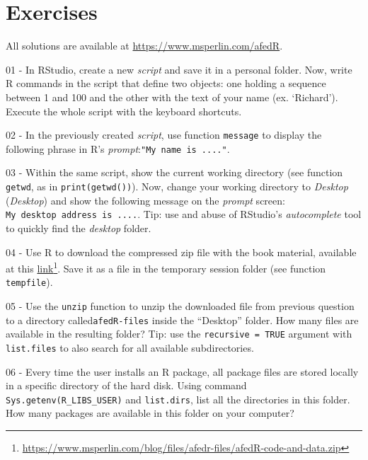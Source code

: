 \documentclass[
  12pt,
]{book}
\begin{document}
\hypertarget{exercises-basic-exercises}{%
\section{Exercises}\label{exercises-basic-exercises}}

All solutions are available at \url{https://www.msperlin.com/afedR}.

01 -
In RStudio, create a new \emph{script} and save it in a personal folder. Now, write R commands in the script that define two objects: one holding a sequence between 1 and 100 and the other with the text of your name (ex. `Richard'). Execute the whole script with the keyboard shortcuts.

02 -
In the previously created \emph{script}, use function \texttt{message} to display the following phrase in R's \emph{prompt}:\texttt{"My\ name\ is\ ...."}.

03 -
Within the same script, show the current working directory (see function \texttt{getwd}, as in \texttt{print(getwd())}). Now, change your working directory to \emph{Desktop} (\emph{Desktop}) and show the following message on the \emph{prompt} screen: \texttt{\textquotesingle{}My\ desktop\ address\ is\ ....\textquotesingle{}}. Tip: use and abuse of RStudio's \emph{autocomplete} tool to quickly find the \emph{desktop} folder.

04 -
Use R to download the compressed zip file with the book material, available at this \href{https://www.msperlin.com/blog/files/afedr-files/afedR-code-and-data.zip}{link}\footnote{\url{https://www.msperlin.com/blog/files/afedr-files/afedR-code-and-data.zip}}. Save it as a file in the temporary session folder (see function \texttt{tempfile}).

05 -
Use the \texttt{unzip} function to unzip the downloaded file from previous question to a directory called\texttt{\textquotesingle{}afedR-files\textquotesingle{}} inside the ``Desktop'' folder. How many files are available in the resulting folder? Tip: use the \texttt{recursive\ =\ TRUE} argument with \texttt{list.files} to also search for all available subdirectories.

06 -
Every time the user installs an R package, all package files are stored locally in a specific directory of the hard disk. Using command \texttt{Sys.getenv(\textquotesingle{}R\_LIBS\_USER\textquotesingle{})} and \texttt{list.dirs}, list all the directories in this folder. How many packages are available in this folder on your computer?
\end{document}

